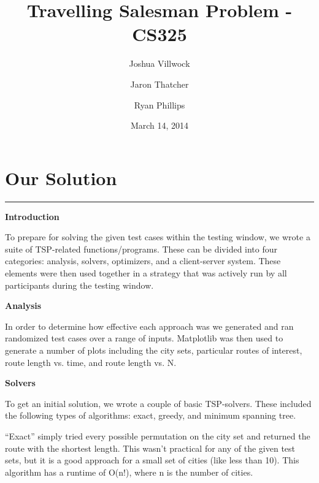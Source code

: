 \documentclass[letterpaper,10pt,titlepage,fleqn]{article}
\begin{document}
\lstset{language=Python} 

\title{Travelling Salesman Problem - CS325}

\author{
	Joshua Villwock \and
	Jaron Thatcher \and
	Ryan Phillips
}

\date{March 14, 2014}
\maketitle



\section*{Our Solution}
\hrule

\begin{Large}
\textbf{Introduction} \\
\end{Large}
To prepare for solving the given test cases within the testing window, we wrote a suite of TSP-related functions/programs. These can be divided into four categories: analysis, solvers, optimizers, and a client-server system. These elements were then used together in a strategy that was actively run by all participants during the testing window. \\

\begin{Large}
\textbf{Analysis} \\
\end{Large}
In order to determine how effective each approach was we generated and ran randomized test cases over a range of inputs. Matplotlib was then used to generate a number of plots including the city sets, particular routes of interest, route length vs. time, and route length vs. N. \\

\begin{Large}
\textbf{Solvers} \\
\end{Large}
To get an initial solution, we wrote a couple of basic TSP-solvers. These included the following types of algorithms: exact, greedy, and minimum spanning tree.

“Exact” simply tried every possible permutation on the city set and returned the route with the shortest length. This wasn’t practical for any of the given test sets, but it is a good approach for a small set of cities (like less than 10). This algorithm has a runtime of O(n!), where n is the number of cities.
\end{document}
